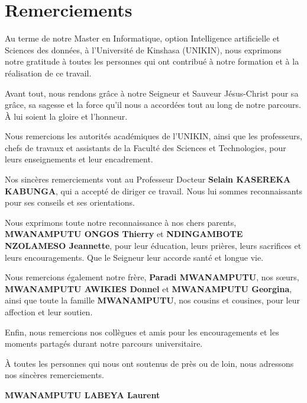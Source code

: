 \chapter*{Remerciements}

Au terme de notre Master en Informatique, option Intelligence
artificielle et Sciences des données, à l'Université de Kinshasa
(UNIKIN), nous exprimons notre gratitude à toutes les personnes
qui ont contribué à notre formation et à la réalisation de ce travail.

Avant tout, nous rendons grâce à notre Seigneur et Sauveur
Jésus-Christ pour sa grâce, sa sagesse et la force qu'il nous a
accordées tout au long de notre parcours. À lui soient la gloire
et l'honneur.

Nous remercions les autorités académiques de l'UNIKIN, ainsi que
les professeurs, chefs de travaux et assistants de la Faculté des
Sciences et Technologies, pour leurs enseignements et leur encadrement.

Nos sincères remerciements vont au Professeur Docteur
\textbf{Selain KASEREKA KABUNGA}, qui a accepté de diriger ce travail.
Nous lui sommes reconnaissants pour ses conseils et ses orientations.

Nous exprimons toute notre reconnaissance à nos chers parents,
\textbf{MWANAMPUTU ONGOS Thierry} et
\textbf{NDINGAMBOTE NZOLAMESO Jeannette}, pour leur éducation,
leurs prières, leurs sacrifices et leurs encouragements. Que le
Seigneur leur accorde santé et longue vie.

Nous remercions également notre frère, \textbf{Paradi MWANAMPUTU},
nos sœurs, \textbf{MWANAMPUTU AWIKIES Donnel} et
\textbf{MWANAMPUTU Georgina}, ainsi que toute la famille
\textbf{MWANAMPUTU}, nos cousins et cousines, pour leur affection
et leur soutien.

Enfin, nous remercions nos collègues et amis pour les encouragements
et les moments partagés durant notre parcours universitaire.

À toutes les personnes qui nous ont soutenus de près ou de loin,
nous adressons nos sincères remerciements.

\vfill

\begin{flushright}
    \begin{minipage}{0.65\linewidth}
        \centering
        \textbf{MWANAMPUTU LABEYA Laurent}
    \end{minipage}
\end{flushright}

\vspace{1cm}